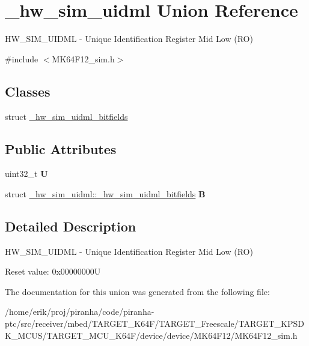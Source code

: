 \hypertarget{union__hw__sim__uidml}{}\section{\+\_\+hw\+\_\+sim\+\_\+uidml Union Reference}
\label{union__hw__sim__uidml}


H\+W\+\_\+\+S\+I\+M\+\_\+\+U\+I\+D\+ML -\/ Unique Identification Register Mid Low (RO)  




{\ttfamily \#include $<$M\+K64\+F12\+\_\+sim.\+h$>$}

\subsection*{Classes}
\begin{DoxyCompactItemize}
\item 
struct \hyperlink{struct__hw__sim__uidml_1_1__hw__sim__uidml__bitfields}{\+\_\+hw\+\_\+sim\+\_\+uidml\+\_\+bitfields}
\end{DoxyCompactItemize}
\subsection*{Public Attributes}
\begin{DoxyCompactItemize}
\item 
uint32\+\_\+t {\bfseries U}\hypertarget{union__hw__sim__uidml_aa5bc8de83bff448b52f083b930e24b51}{}\label{union__hw__sim__uidml_aa5bc8de83bff448b52f083b930e24b51}

\item 
struct \hyperlink{struct__hw__sim__uidml_1_1__hw__sim__uidml__bitfields}{\+\_\+hw\+\_\+sim\+\_\+uidml\+::\+\_\+hw\+\_\+sim\+\_\+uidml\+\_\+bitfields} {\bfseries B}\hypertarget{union__hw__sim__uidml_a02b419135d091bca7346cc4b3c8e3429}{}\label{union__hw__sim__uidml_a02b419135d091bca7346cc4b3c8e3429}

\end{DoxyCompactItemize}


\subsection{Detailed Description}
H\+W\+\_\+\+S\+I\+M\+\_\+\+U\+I\+D\+ML -\/ Unique Identification Register Mid Low (RO) 

Reset value\+: 0x00000000U 

The documentation for this union was generated from the following file\+:\begin{DoxyCompactItemize}
\item 
/home/erik/proj/piranha/code/piranha-\/ptc/src/receiver/mbed/\+T\+A\+R\+G\+E\+T\+\_\+\+K64\+F/\+T\+A\+R\+G\+E\+T\+\_\+\+Freescale/\+T\+A\+R\+G\+E\+T\+\_\+\+K\+P\+S\+D\+K\+\_\+\+M\+C\+U\+S/\+T\+A\+R\+G\+E\+T\+\_\+\+M\+C\+U\+\_\+\+K64\+F/device/device/\+M\+K64\+F12/M\+K64\+F12\+\_\+sim.\+h\end{DoxyCompactItemize}
